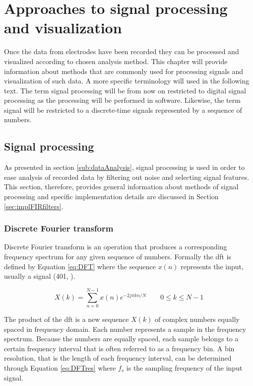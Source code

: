 \chapter{Approaches to signal processing and visualization} \label{appProcVis}
Once the data from electrodes have been recorded they can be processed and visualized according to chosen analysis method. This chapter will provide information about methods that are commonly used for processing signals and visualization of such data. A more specific terminology will used in the following text. The term signal processing will be from now on restricted to digital signal processing as the processing will be performed in software. Likewise, the term signal will be restricted to a discrete-time signals represented by a sequence of numbers. 

\section{Signal processing} \label{sec:sigProc}
As presented in section \ref{sub:dataAnalysis}, signal processing is used
in order to ease analysis of recorded data by filtering out noise and selecting
signal features. This section, therefore, provides general information about
methods of signal processing and specific implementation details are discussed in Section \ref{sec:implFIRfilters}. 

\subsection{Discrete Fourier transform}
Discrete Fourier transform is an operation that produces a corresponding frequency spectrum for any given sequence of numbers. Formally the \gls{dft} is defined by Equation \ref{eq:DFT} where the sequence $x(n)$ represents the input, usually a signal (401, \cite{DSP3}). 

\begin{equation}
\label{eq:DFT}
	X(k) = \sum\limits_{n=0}^{N - 1}x(n)e^{-2 j \pi k n /N} \qquad 0 \leq k \leq N-1
\end{equation}

The product of the \gls{dft} is a new sequence $X(k)$ of complex numbers equally spaced in frequency domain. Each number represents a sample in the frequency spectrum. Because the numbers are equally spaced, each sample belongs to a certain frequency interval that is often referred to as a frequency bin. A bin resolution, that is the length of each frequency interval, can be determined through Equation \ref{eq:DFTres} where $f_s$ is the sampling frequency of the input signal. 

